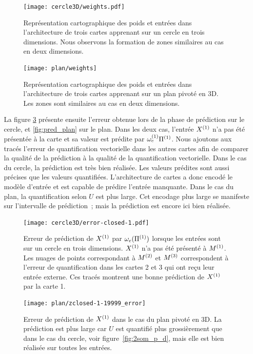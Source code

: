 \documentclass[../main]{subfiles}
\begin{document}
\begin{figure}[h!]
	\centering\texttt{[image: cercle3D/weights.pdf]}
	\caption{Représentation cartographique des poids et entrées dans l'architecture de trois cartes apprenant sur un cercle en trois dimensions. Nous observons la formation de zones similaires au cas en deux dimensions. \label{fig:w_cercle}}
\end{figure}

\begin{figure}[h!]
	\centering\texttt{[image: plan/weights]}
	\caption{Représentation cartographique des poids et entrées dans l'architecture de trois cartes apprenant sur un plan pivoté en 3D. Les zones sont similaires au cas en deux dimensions. \label{fig:w_plan3}}
\end{figure}


La figure \ref{fig:pred_cercle} présente ensuite l'erreur obtenue lors de la phase de prédiction sur le cercle, et \ref{fig:pred_plan} sur le plan.
Dans les deux cas, l'entrée $X^{({1})}$ n'a pas été présentée à la carte et sa valeur est prédite par $\omega_{e}^{({1})}{\Pi^{({1})}}$. 
Nous ajoutons aux tracés l'erreur de quantification vectorielle dans les autres cartes afin de comparer la qualité de la prédiction à la qualité de la quantification vectorielle.
Dans le cas du cercle, la prédiction est très bien réalisée. Les valeurs prédites sont aussi précises que les valeurs quantifiées. 
L'architecture de cartes a donc encodé le modèle d'entrée et est capable de prédire l'entrée manquante.
Dans le cas du plan, la quantification selon $U$ est plus large. 
Cet encodage plus large se manifeste sur l'intervalle de prédiction~; mais la prédiction est encore ici bien réalisée. 

\begin{figure}
	\texttt{[image: cercle3D/error-closed-1.pdf]}
	\caption{Erreur de prédiction de $X^{({1})}$ par $\omega_e(\Pi^{({1})})$ lorsque les entrées sont sur un cercle en trois dimensions. $X^{({1})}$ n'a pas été présenté à $M^{({1})}$.
	 Les nuages de points correspondant à $M^{({2})}$ et $M^{({3})}$ correspondent à l'erreur de quantification dans les cartes 2 et 3 qui ont reçu leur entrée externe. Ces tracés montrent une bonne prédiction de $X^{({1})}$ par la carte 1. \label{fig:pred_cercle}}
\end{figure}

\begin{figure}
	\texttt{[image: plan/zclosed-1-19999\_error]}	
	\caption{Erreur de prédiction de $X^{({1})}$ dans le cas du plan pivoté en 3D. La prédiction est plus large car $U$ est quantifié plus grossièrement que dans le cas du cercle, voir figure~\ref{fig:2som_p_d}, mais elle est bien réalisée sur toutes les entrées. \label{fig:plan3_pred}}
\end{figure}
\end{document}
